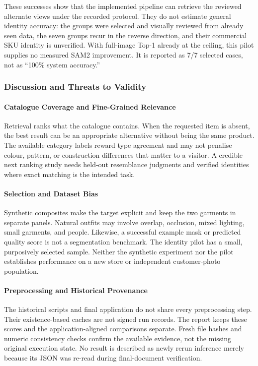 These successes show that the implemented pipeline can retrieve the reviewed
alternate views under the recorded protocol. They do not estimate general
identity accuracy: the groups were selected and visually reviewed from already
seen data, the seven groups recur in the reverse direction, and their commercial
SKU identity is unverified. With full-image Top-1 already at the ceiling, this
pilot supplies no measured SAM2 improvement. It is reported as 7/7 selected
cases, not as ``100\% system accuracy.''

\subsubsection{Discussion and Threats to Validity}
\paragraph{Catalogue Coverage and Fine-Grained Relevance}
Retrieval ranks what the catalogue contains. When the requested item is absent,
the best result can be an appropriate alternative without being the same product.
The available category labels reward type agreement and may not penalise colour,
pattern, or construction differences that matter to a visitor. A credible next
ranking study needs held-out resemblance judgments and verified identities
where exact matching is the intended task.

\paragraph{Selection and Dataset Bias}
Synthetic composites make the target explicit and keep the two garments in
separate panels. Natural outfits may involve overlap, occlusion, mixed lighting,
small garments, and people. Likewise, a successful example mask or predicted
quality score is not a segmentation benchmark. The identity pilot has a small,
purposively selected sample. Neither the synthetic experiment nor the pilot
establishes performance on a new store or independent customer-photo population.

\paragraph{Preprocessing and Historical Provenance}
The historical scripts and final application do not share every preprocessing
step. Their existence-based caches are not signed run records. The report keeps
these scores and the application-aligned comparisons separate. Fresh file hashes
and numeric consistency checks confirm the available evidence, not the missing
original execution state. No result is described as newly rerun inference merely
because its JSON was re-read during final-document verification.

